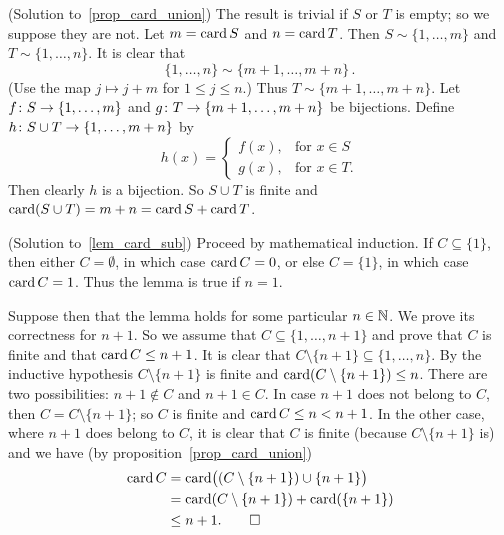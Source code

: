 \begin{prf}\label{sol_prop_card_union}(Solution to~\ref{prop_card_union})
The result is trivial if $S$ or $T$ is empty; so we suppose they are not. Let $m = \operatorname{card} S$
and $n = \operatorname{card} T$.  Then $S \sim \{1,\dots,m\}$ and $T \sim \{1,\dots,n\}$. It is clear that
  \[ \{1,\dots,n\} \sim \{m+1,\dots,m + n\}\,. \]
(Use the map $j \mapsto j + m$ for $1 \le j \le n$.)  Thus $T \sim \{m + 1,\dots,m + n\}$. Let
$f \colon S \rightarrow \{1,\dots,m\}$ and $g \colon T \rightarrow \{m + 1,\dots,m + n\}$ be bijections.
Define $h \colon S \cup T \rightarrow \{1,\dots,m + n\}$ by
  \[h(x) = \begin{cases}
              f(x), &\text{for $x \in S$}\\
              g(x), &\text{for $x \in T$.}
           \end{cases} \]
Then clearly $h$ is a bijection.  So $S \cup T$ is finite and $\operatorname{card}(S \cup T) = m + n = \operatorname{card} S + \operatorname{card} T$.
\end{prf}

\begin{prf}\label{sol_lem_card_sub}(Solution to~\ref{lem_card_sub})
Proceed by mathematical induction. If $C \subseteq \{1\}$, then either $C = \emptyset$, in
which case $\operatorname{card} C = 0$, or else $C = \{1\}$, in which case $\operatorname{card} C = 1$. Thus the lemma is
true if $n = 1$.

Suppose then that the lemma holds for some particular $n \in \mathbb{N}$. We prove its correctness for
$n + 1$. So we assume that $C \subseteq \{1,\dots,n + 1\}$ and prove that $C$ is finite and
that $\operatorname{card} C \le n + 1$.  It is clear that $C \setminus \{n + 1\} \subseteq \{1,\dots,n\}$.
By the inductive hypothesis $C \setminus \{n + 1\}$ is finite and $\operatorname{card}(C \setminus \{n +
1\}) \le n$.  There are two possibilities: $n + 1 \notin C$ and $n + 1 \in C$. In case $n + 1$
does not belong to $C$, then $C = C \setminus \{n + 1\}$; so $C$ is finite and $\operatorname{card} C \le n
< n + 1$.  In the other case, where $n + 1$ does belong to $C$, it is clear that $C$ is finite
(because $C \setminus \{n + 1\}$ is) and we have (by proposition~\ref{prop_card_union})
  \begin{align*}
       \operatorname{card} C  &= \operatorname{card}\bigl((C \setminus \{n + 1\}) \cup \{n + 1\}\bigr) \\
                &= \operatorname{card}(C \setminus \{n + 1\}) + \operatorname{card}(\{n + 1\}) \\
                &\le n + 1.        \qedhere
  \end{align*}
\end{prf}

